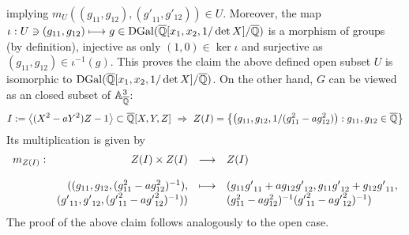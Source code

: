 implying $m_U\left((g_{11},g_{12}),({g'}_{11},g'_{12})\right) \in U$. Moreover, the map $\iota: U \ni (g_{11},g_{12}) \longmapsto g \in  \trm{DGal}(\currfield[x_1,x_2,1/\det X]/\currfield)$ is a morphism of groups (by definition), injective as only $(1,0) \in \ker \iota$ and surjective as $(g_{11},g_{12}) \in \iota^{-1}(g)$. This proves the claim the above defined open subset $U$ is isomorphic to $\trm{DGal}(\currfield[x_1,x_2,1/\det X]/\currfield)$.
On the other hand, $G$ can be viewed as an closed subset of $\aff{3}_{\currfield}$:
$$I := \left<(X^2 - a Y^2) Z - 1\right> \subset \ov{\qz}[X,Y,Z]\ \RA\ Z(I) = \left\{\left(g_{11}, g_{12}, 1/(g_{11}^2 - a g_{12}^2)\right) : g_{11}, g_{12} \in \currfield\right\}$$
Its multiplication is given by
$$\bao{rrcl}
m_{Z(I)} :& Z(I) \times Z(I) & \longrightarrow & Z(I)\\
&&&\\
&((g_{11}, g_{12}, (g_{11}^2 - a g_{12}^2)^{-1}), & \longmapsto &(g_{11} {g'}_{11} + a g_{12} {g'}_{12}, g_{11} {g'}_{12} + g_{12} {g'}_{11},\\
& ({g'}_{11}, {g'}_{12}, ({g'}_{11}^2 - a {g'}_{12}^2)^{-1}))&&(g_{11}^2 - a g_{12}^2)^{-1}({g'}_{11}^2 - a {g'}_{12}^2)^{-1})\\
\ea$$
The proof of the above claim follows analogously to the open case. %
